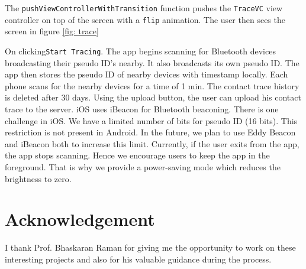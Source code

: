 \documentclass[12pt, conference, a4paper]{article}
\begin{document}
The \texttt{pushViewControllerWithTransition} function pushes the \texttt{TraceVC}  view controller on top of the screen with a \texttt{flip} animation. The user then sees the screen in figure \ref{fig: trace}

On clicking\texttt{Start Tracing}. The app begins scanning for Bluetooth devices broadcasting their pseudo ID's nearby. It also broadcasts its own pseudo ID. 
The app then stores the pseudo ID of nearby devices with timestamp locally. Each phone scans for the nearby devices for a time of 1 min. The contact trace history is deleted after 30 days.
Using the upload button, the user can upload his contact trace to the server. 
iOS uses iBeacon for Bluetooth beaconing. There is one challenge in iOS. We have a limited number of bits for pseudo ID (16 bits). This restriction is not present in Android.
In the future, we plan to use Eddy Beacon and iBeacon both to increase this limit. 
Currently, if the user exits from the app, the app stops scanning. Hence we encourage users to keep the app in the foreground. That is why we provide a power-saving mode which 
reduces the brightness to zero. 


\section{Acknowledgement}
\label{SEC:acknowledgement}
I thank Prof. Bhaskaran Raman for giving me the opportunity to work on these interesting projects and also for his valuable guidance during the process. 

\newpage
\nocite{*}
\printbibliography
\end{document}
